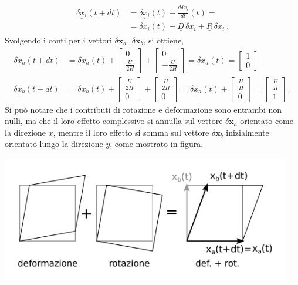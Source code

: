 \documentclass[11pt,fleqn]{article}
\newcommand{\ul}[1]{\underline{#1}}
\newcommand{\uul}[1]{\ul{\ul{#1}}}
\begin{document}
\begin{equation}
 \begin{aligned}
     \ul{\delta x_i}(t+dt) & = \ul{\delta x_i}(t) + \frac{d \ul{\delta x_i}}{ dt}(t) = \\
     & = \ul{\delta x_i}(t) + \uul{D} \, \ul{\delta x_i} + 
                              \uul{R} \, \ul{\delta x_i} \ .
 \end{aligned}
\end{equation}
Svolgendo i conti per i vettori $\delta \bm{x}_a$, $\delta \bm{x}_b$, si ottiene,
\begin{equation}
 \begin{aligned}
     \ul{\delta x_a}(t+dt) & = \ul{\delta x_a}(t) +
     \left[ \begin{array}{c} 0 \\  \frac{U}{2H} \end{array}  \right] +
     \left[ \begin{array}{c} 0 \\ -\frac{U}{2H} \end{array}  \right] =
     \ul{\delta x_a}(t) =
     \left[ \begin{array}{c} 1 \\ 0 \end{array}  \right]
         \\
     \ul{\delta x_b}(t+dt) & = \ul{\delta x_b}(t) +
     \left[ \begin{array}{c} \frac{U}{2H} \\ 0 \end{array}  \right] +
     \left[ \begin{array}{c} \frac{U}{2H} \\ 0 \end{array}  \right] = 
     \ul{\delta x_a}(t) + 
     \left[ \begin{array}{c} \frac{U}{H} \\ 0 \end{array}  \right] =
     \left[ \begin{array}{c} \frac{U}{H} \\ 1 \end{array}  \right] \ .
 \end{aligned}
\end{equation}
Si può notare che i contributi di rotazione e deformazione sono entrambi non nulli, ma che il loro effetto complessivo si annulla sul vettore $\delta \bm{x}_a$ orientato come la direzione $x$, mentre il loro effetto si somma sul vettore $\delta \bm{x}_b$ inizialmente orientato lungo la direzione $y$, come mostrato in figura.

\begin{center}
 \includegraphics[width=0.95\textwidth]{./rotdef}
\end{center}
\end{document}
